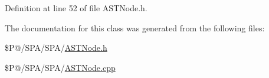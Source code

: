 Definition at line 52 of file A\-S\-T\-Node.\-h.



The documentation for this class was generated from the following files\-:\begin{DoxyCompactItemize}
\item 
\$\-P@/\-S\-P\-A/\-S\-P\-A/\hyperlink{_a_s_t_node_8h}{A\-S\-T\-Node.\-h}\item 
\$\-P@/\-S\-P\-A/\-S\-P\-A/\hyperlink{_a_s_t_node_8cpp}{A\-S\-T\-Node.\-cpp}\end{DoxyCompactItemize}

